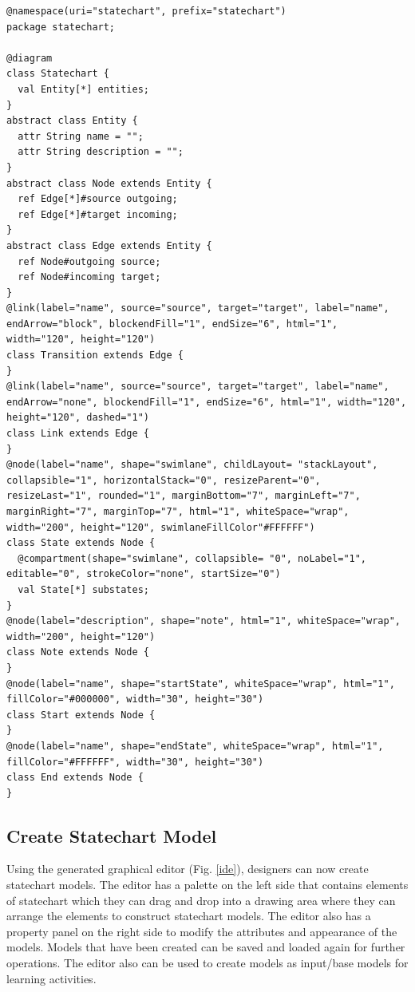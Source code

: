 \documentclass[conference]{IEEEtran}
\begin{document}
\begin{lstlisting}[style=interfaces,caption={A definition of statechart diagram using Emfatic and Eugenia-like annotations.},label=metamodel]
@namespace(uri="statechart", prefix="statechart")
package statechart;

@diagram
class Statechart {
  val Entity[*] entities;
}
abstract class Entity {
  attr String name = "";
  attr String description = "";
}
abstract class Node extends Entity {
  ref Edge[*]#source outgoing;
  ref Edge[*]#target incoming;
}
abstract class Edge extends Entity {
  ref Node#outgoing source;
  ref Node#incoming target;
}
@link(label="name", source="source", target="target", label="name", endArrow="block", blockendFill="1", endSize="6", html="1", width="120", height="120")
class Transition extends Edge {
}
@link(label="name", source="source", target="target", label="name", endArrow="none", blockendFill="1", endSize="6", html="1", width="120", height="120", dashed="1")
class Link extends Edge {
}
@node(label="name", shape="swimlane", childLayout= "stackLayout", collapsible="1", horizontalStack="0", resizeParent="0", resizeLast="1", rounded="1", marginBottom="7", marginLeft="7", marginRight="7", marginTop="7", html="1", whiteSpace="wrap", width="200", height="120", swimlaneFillColor"#FFFFFF")
class State extends Node {
  @compartment(shape="swimlane", collapsible= "0", noLabel="1", editable="0", strokeColor="none", startSize="0")
  val State[*] substates;
}
@node(label="description", shape="note", html="1", whiteSpace="wrap", width="200", height="120")
class Note extends Node {
}
@node(label="name", shape="startState", whiteSpace="wrap", html="1", fillColor="#000000", width="30", height="30")
class Start extends Node {
}
@node(label="name", shape="endState", whiteSpace="wrap", html="1", fillColor="#FFFFFF", width="30", height="30")
class End extends Node {
}
\end{lstlisting} 

\subsection{Create Statechart Model}
Using the generated graphical editor (Fig. \ref{ide}), designers can now create statechart models. The editor has a palette on the left side that contains elements of statechart which they can drag and drop into a drawing area where they can arrange the elements to construct statechart models. The editor also has a property panel on the right side to modify the attributes and appearance of the models. Models that have been created can be saved and loaded again for further operations. The editor also can be used to create models as input/base models for learning activities.        
\end{document}
